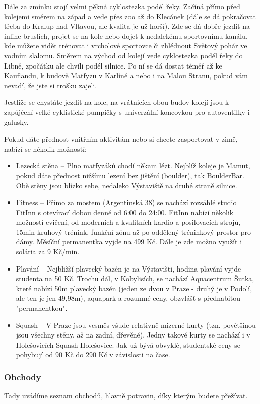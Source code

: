 Dále za zmínku stojí velmi pěkná cyklostezka podél řeky. Začíná přímo před kolejemi směrem na západ a vede přes zoo až do Klecánek (dále se dá pokračovat třeba do Kralup nad Vltavou, ale kvalita je už horší). Zde se dá dobře jezdit na inline bruslích, projet se na kole nebo dojet k nedalekému sportovnímu kanálu, kde můžete vidět trénovat i vrcholové sportovce či zhlédnout Světový pohár ve vodním slalomu. Směrem na východ od kolejí vede cyklostezka podél řeky do Libně, zpočátku ale chvíli podél silnice. Po ní se dá dostat téměř až ke Kauflandu, k budově Matfyzu v Karlíně a nebo i na Malou Stranu, pokud vám nevadí, že jste si trošku zajeli.

Jestliže se chystáte jezdit na kole, na vrátnicích obou budov kolejí jsou k zapůjčení velké cyklistické pumpičky s univerzální koncovkou pro autoventilky i galusky.

Pokud dáte přednost vnitřním aktivitám nebo si chcete zasportovat v zimě, nabízí se několik možností:

\begin{itemize}
    \item Lezecká stěna – Plno matfyzáků chodí někam lézt. Nejblíž koleje je Mamut, pokud dáte přednost nižšímu lezení bez jištění (boulder), tak BoulderBar. Obě stěny jsou blízko sebe, nedaleko Výstaviště na druhé straně silnice.
    \item Fitness – Přímo za mostem (Argentinská 38) se nachází rozsáhlé studio FitInn s otevírací dobou denně od 6:00 do 24:00. FitInn nabízí několik možností cvičení, od moderních a kvalitních kardio a posilovacích strojů, 15min kruhový trénink, funkční zónu až po oddělený tréninkový prostor pro dámy. Měsíční permanentka vyjde na 499 Kč. Dále je zde možno využít i solária za 9 Kč/min.
    \item Plavání – Nejbližší plavecký bazén je na Výstavišti, hodina plavání vyjde studenta na 50 Kč. Trochu dál, v Kobylisích, se nachází Aquacentrum Šutka, které nabízí 50m plavecký bazén (jeden ze dvou v Praze - druhý je v Podolí, ale ten je jen 49,98m), aquapark a rozumné ceny, obzvlášť s přednabitou "permanentkou".
    \item Squash – V Praze jsou vesměs všude relativně mizerné kurty (tzn. povětšinou jsou všechny stěny, až na zadní, dřevěné). Jedny takové kurty se nachází i v Holešovicích Squash-Holešovice. Jak už bývá obvyklé, studentské ceny se pohybují od 90 Kč do 290 Kč v závislosti na čase.
\end{itemize}

\subsubsection{Obchody}
Tady uvádíme seznam obchodů, hlavně potravin, díky kterým budete přežívat.

